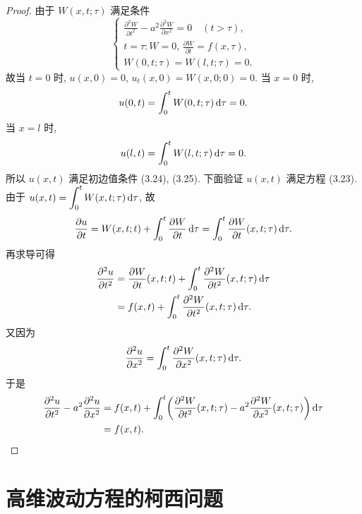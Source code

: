 \begin{proof}
  由于 $W(x,t;\tau)$ 满足条件
  \[\begin{cases}
    \frac{\partial^2W}{\partial t^2} - a^2 \frac{\partial^2W}{\partial x^2} = 0\quad (t>\tau), \\
    t = \tau: W=0,\,\frac{\partial W}{\partial t} = f(x,\tau), \\
    W(0,t;\tau) = W(l,t;\tau) = 0.
  \end{cases}\]
  故当 $t=0$ 时, $u(x,0) = 0$, $u_t(x,0) = W(x,0;0) = 0$.
  当 $x=0$ 时,
  \[u(0, t) = \int_0^t W(0,t;\tau)\mathop{}\!\mathrm{d}\tau = 0.\]
  当 $x=l$ 时,
  \[u(l, t) = \int_0^t W(l,t;\tau)\mathop{}\!\mathrm{d}\tau = 0.\]
  所以 $u(x,t)$ 满足初边值条件 (3.24), (3.25). 下面验证 $u(x,t)$ 满足方程 (3.23).
  由于 $\displaystyle u(x,t) = \int_0^t W(x,t;\tau)\mathop{}\!\mathrm{d}\tau$, 故
  \[\frac{\partial u}{\partial t} = W(x,t;t) + \int_0^t \frac{\partial W}{\partial t}\mathop{}\!\mathrm{d}\tau
    = \int_0^t \frac{\partial W}{\partial t}(x,t;\tau)\mathop{}\!\mathrm{d}\tau.\]
  再求导可得
  \begin{align*}
    \frac{\partial^2u}{\partial t^2}
    & = \frac{\partial W}{\partial t}(x,t;t)
      + \int_0^t \frac{\partial^2W}{\partial t^2}(x,t;\tau)\mathop{}\!\mathrm{d}\tau \\
    & = f(x,t) + \int_0^t \frac{\partial^2W}{\partial t^2}(x,t;\tau)\mathop{}\!\mathrm{d}\tau.
  \end{align*}
  又因为
  \[\frac{\partial^2u}{\partial x^2} 
    = \int_0^t \frac{\partial^2W}{\partial x^2}(x,t;\tau)\mathop{}\!\mathrm{d}\tau.\]
  于是
  \begin{align*}
    \frac{\partial^2u}{\partial t^2} - a^2 \frac{\partial^2u}{\partial x^2}
    & = f(x,t) + \int_0^t \biggl(\frac{\partial ^2W}{\partial t^2}(x,t;\tau)
      - a^2 \frac{\partial^2W}{\partial x^2}(x,t;\tau)\biggr)\mathop{}\!\mathrm{d}\tau \\
    & = f(x,t).\qedhere
  \end{align*}
\end{proof}


\section{高维波动方程的柯西问题}



